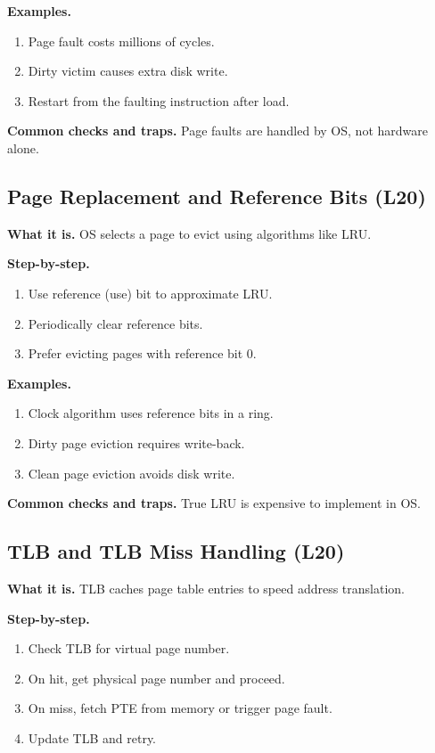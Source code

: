 \documentclass[11pt]{article}
\begin{document}
\textbf{Examples.}
\begin{enumerate}[leftmargin=*]
  \item Page fault costs millions of cycles.
  \item Dirty victim causes extra disk write.
  \item Restart from the faulting instruction after load.
\end{enumerate}

\textbf{Common checks and traps.} Page faults are handled by OS, not hardware alone.

\subsection{Page Replacement and Reference Bits (L20)}
\textbf{What it is.} OS selects a page to evict using algorithms like LRU.

\textbf{Step-by-step.}
\begin{enumerate}[leftmargin=*]
  \item Use reference (use) bit to approximate LRU.
  \item Periodically clear reference bits.
  \item Prefer evicting pages with reference bit 0.
\end{enumerate}

\textbf{Examples.}
\begin{enumerate}[leftmargin=*]
  \item Clock algorithm uses reference bits in a ring.
  \item Dirty page eviction requires write-back.
  \item Clean page eviction avoids disk write.
\end{enumerate}

\textbf{Common checks and traps.} True LRU is expensive to implement in OS.

\subsection{TLB and TLB Miss Handling (L20)}
\textbf{What it is.} TLB caches page table entries to speed address translation.

\textbf{Step-by-step.}
\begin{enumerate}[leftmargin=*]
  \item Check TLB for virtual page number.
  \item On hit, get physical page number and proceed.
  \item On miss, fetch PTE from memory or trigger page fault.
  \item Update TLB and retry.
\end{enumerate}
\end{document}
